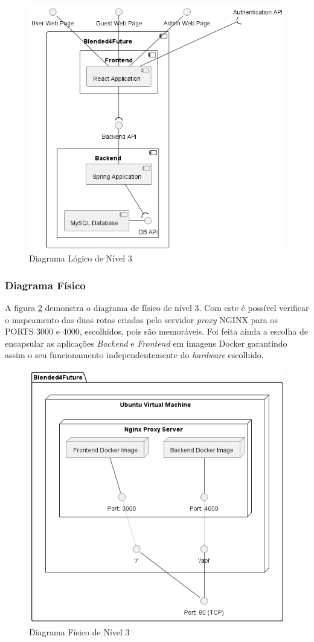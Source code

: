 \begin{figure}[h!tbp]
    \centering
    \includegraphics[width=0.8\linewidth]{capitulos/cap3-analisedoproblema/assets/arquiteturasistema/logical/logical_l3.png}
    \caption{Diagrama Lógico de Nível 3}
    \label{fig:diagram-lvl3-logical}
\end{figure}

\subsubsection{Diagrama Físico} 
A figura \ref{fig:diagram-lvl3-physical} demonstra o diagrama de físico de nível 3. Com este é possível verificar o mapeamento das duas rotas criadas pelo servidor \textit{proxy} \gls{NGINX} para os PORTS 3000 e 4000, escolhidos, pois são memoráveis. Foi feita ainda a escolha de encapsular as aplicações \textit{Backend} e \textit{Frontend} em imagens \gls{Docker} garantindo assim o seu funcionamento independentemente do \textit{hardware} escolhido.

\begin{figure}[h!tbp]
    \centering
    \includegraphics[width=0.7\linewidth]{capitulos/cap3-analisedoproblema/assets/arquiteturasistema/physical/physical_l3.png}
    \caption{Diagrama Físico de Nível 3}
    \label{fig:diagram-lvl3-physical}
\end{figure}





